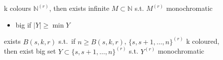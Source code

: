 \begin{thm}
    k colours $\mathbb{N}^{(r)}$, then exists infinite $M \subset \mathbb{N}$ s.t. $M^{(r)}$ monochromatic
\end{thm}

\begin{itemize}
    \item big if $|Y| \geq \min Y$
\end{itemize}

\begin{thm}
    exists $B(s, k, r)$ s.t.\ if $n \geq B(s, k, r)$, $\{s, s+1, \dots, n\}^{(r)}$ k coloured, \\
    then exist big set $Y \subset \{s, s+1, \dots, n\}^{(r)}$ s.t. $Y^{(r)}$ monochromatic
\end{thm}

